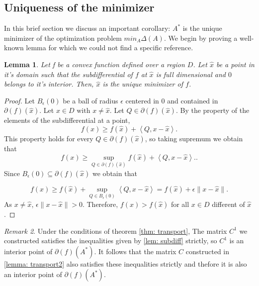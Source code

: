 \documentclass[12pt]{amsart}
\newtheorem{lemma}{Lemma}[section]
\theoremstyle{remark}
\newtheorem{remark}[lemma]{Remark}
\begin{document}
\subsection*{Uniqueness of the minimizer}
In this brief section we discuss an important corollary: $A^*$ is the unique minimizer of the optimization problem $min_A\Delta (A)$.
We begin by proving a well-known lemma for which we could not find a specific reference.

\begin{lemma}{\label{lemUniqueness}}
Let f be a convex function defined over a region $D$. Let $\hat{x}$ be a point in it's domain such that the subdifferential of $f$ at $\hat{x}$ is full dimensional and $0$ belongs to it's interior. Then, $\hat{x}$ is the unique minimizer of $f$.
\end{lemma}
\begin{proof}
Let $B_\epsilon(0)$ be a ball of radius $\epsilon$ centered in $0$ and contained in 
$\partial(f)(\hat{x})$. Let $x \in D \text{ with } x \neq \hat{x}$. Let $Q \in \partial(f)(\hat{x})$. By the property of the elements of the subdifferential at a point, 
\[
f(x) \geq f(\hat{x}) + \left \langle Q,x-\hat{x} \right \rangle.
\]
This property holds for every $Q \in \partial(f)(\hat{x})$, so taking supremum we obtain that
\[
f(x) \geq \sup_{Q \in \partial(f)(\hat{x})} f(\hat{x}) + \left \langle Q,x-\hat{x} \right \rangle..
\]
Since $B_\epsilon(0) \subseteq \partial(f)(\hat{x})$ we obtain that

\[
 f(x) \geq f(\hat{x})+\sup_{Q \in B_\epsilon(0)} \left \langle Q,x-\hat{x} \right \rangle = f(\hat{x})+ \epsilon\| x-\hat{x} \|.
\]
As $x \neq \hat{x}$, $\epsilon \| x-\hat{x} \|> 0$. Therefore, $f(x)>f(\hat{x})$ for all $x\in D$ different of $\hat{x}$.

\end{proof}

\begin{remark}{\label{remUnicity}}
Under the conditions of theorem \ref{thm: transport}, The matrix $C^1$ we constructed satisfies the inequalities given by \ref{lem: subdiff} strictly, so $C^1$ is an interior point of $\partial(f)(A^*)$. It follows that the matrix $C$ constructed in \ref{lemma: transport2} also satisfies these inequalities strictly and thefore it is also an interior point of $\partial(f)(A^*)$.
\end{remark}
\end{document}
